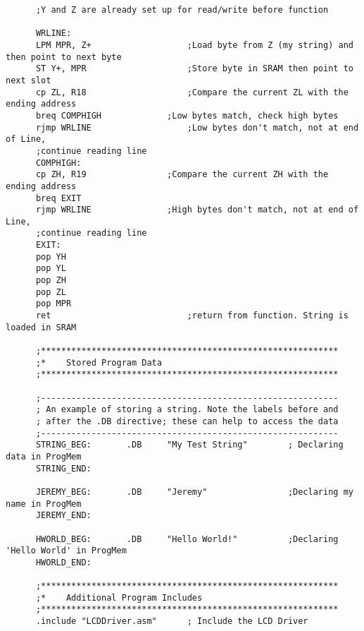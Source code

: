 \documentclass[12pt,letterpaper]{article}
\begin{document}
\begin{verbatim}
      ;Y and Z are already set up for read/write before function
      
      WRLINE:
      LPM MPR, Z+					;Load byte from Z (my string) and then point to next byte
      ST Y+, MPR					;Store byte in SRAM then point to next slot
      cp ZL, R18					;Compare the current ZL with the ending address
      breq COMPHIGH				;Low bytes match, check high bytes
      rjmp WRLINE					;Low bytes don't match, not at end of Line,
      ;continue reading line
      COMPHIGH:
      cp ZH, R19				;Compare the current ZH with the ending address
      breq EXIT
      rjmp WRLINE				;High bytes don't match, not at end of Line,
      ;continue reading line
      EXIT:
      pop YH
      pop YL
      pop ZH
      pop ZL
      pop MPR
      ret							;return from function. String is loaded in SRAM
      
      ;***********************************************************
      ;*	Stored Program Data
      ;***********************************************************
      
      ;-----------------------------------------------------------
      ; An example of storing a string. Note the labels before and
      ; after the .DB directive; these can help to access the data
      ;-----------------------------------------------------------
      STRING_BEG:		.DB		"My Test String"		; Declaring data in ProgMem
      STRING_END:
      
      JEREMY_BEG:		.DB 	"Jeremy"				;Declaring my name in ProgMem
      JEREMY_END:
      
      HWORLD_BEG:		.DB 	"Hello World!"			;Declaring 'Hello World' in ProgMem
      HWORLD_END:
      
      ;***********************************************************
      ;*	Additional Program Includes
      ;***********************************************************
      .include "LCDDriver.asm"		; Include the LCD Driver
      
    \end{verbatim}
    
    \clearpage 
    
\end{document}
